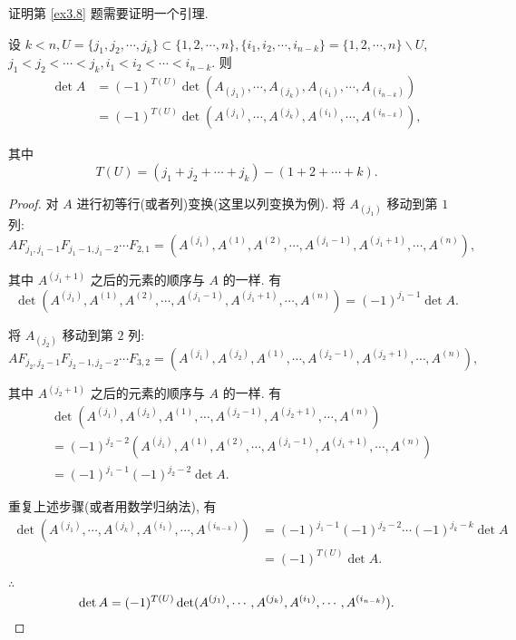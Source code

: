 \documentclass[color=black,device=normal,lang=cn,mode=geye]{elegantnote}
\begin{document}
证明第 \ref{ex3.8} 题需要证明一个引理.
\begin{lemma}\label{l5.1}
    设 $k<n,U=\{j_1,j_2,\cdots,j_k\}\subset\{1,2,\cdots,n\},\{i_1,i_2,\cdots,i_{n-k}\}=\{1,2,\cdots,n\}\backslash U$, $j_1<j_2<\cdots<j_k,i_1<i_2<\cdots<i_{n-k}$. 则
    \begin{align*}
        \det A & =(-1)^{T(U)}\det(A_{(j_1)},\cdots,A_{(j_k)},A_{(i_1)},\cdots,A_{(i_{n-k})}) \\
        & =(-1)^{T(U)}\det(A^{(j_1)},\cdots,A^{(j_k)},A^{(i_1)},\cdots,A^{(i_{n-k})}),
    \end{align*}

    其中
    \[T(U)=(j_1+j_2+\cdots+j_k)-(1+2+\cdots+k).\]
\end{lemma}
\begin{proof}
    对 $A$ 进行初等行(或者列)变换(这里以列变换为例). 将 $A_{(j_{1})}$ 移动到第 $1$ 列:
    \[AF_{j_1,j_1-1}F_{j_1-1,j_1-2}\cdots F_{2,1}=(A^{(j_1)},A^{(1)},A^{(2)},\cdots,A^{(j_{1}-1)},A^{(j_{1}+1)},\cdots,A^{(n)}),\]

    其中 $A^{(j_{1}+1)}$ 之后的元素的顺序与 $A$ 的一样. 有
    \[\det(A^{(j_1)},A^{(1)},A^{(2)},\cdots,A^{(j_{1}-1)},A^{(j_{1}+1)},\cdots,A^{(n)})=(-1)^{j_1-1}\det A.\]

    将 $A_{(j_{2})}$ 移动到第 $2$ 列:
    \[AF_{j_2,j_2-1}F_{j_2-1,j_2-2}\cdots F_{3,2}=(A^{(j_1)},A^{(j_2)},A^{(1)},\cdots,A^{(j_{2}-1)},A^{(j_{2}+1)},\cdots,A^{(n)}),\]

    其中 $A^{(j_{2}+1)}$ 之后的元素的顺序与 $A$ 的一样. 有
    \begin{align*}
        & \det(A^{(j_1)},A^{(j_2)},A^{(1)},\cdots,A^{(j_{2}-1)},A^{(j_{2}+1)},\cdots,A^{(n)}) \\
        & =(-1)^{j_2-2}(A^{(j_1)},A^{(1)},A^{(2)},\cdots,A^{(j_{1}-1)},A^{(j_{1}+1)},\cdots,A^{(n)}) \\
        & =(-1)^{j_1-1}(-1)^{j_2-2}\det A.
    \end{align*}

    重复上述步骤(或者用数学归纳法), 有
    \begin{align*}
        \det(A^{(j_1)},\cdots,A^{(j_k)},A^{(i_1)},\cdots,A^{(i_{n-k})}) & =(-1)^{j_1-1}(-1)^{j_2-2}\cdots(-1)^{j_k-k}\det A \\
        & =(-1)^{T(U)}\det A.
    \end{align*}

    $\therefore$
    \[\det A=(-1)^{T(U)}\det(A^{(j_1)},\cdots,A^{(j_k)},A^{(i_1)},\cdots,A^{(i_{n-k})}).\qedhere\]
\end{proof}
\end{document}
